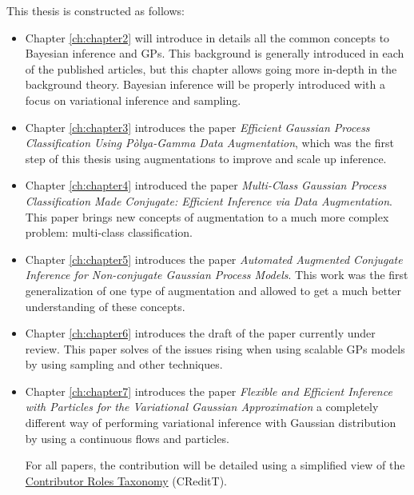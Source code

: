 This thesis is constructed as follows:
\begin{itemize}
    \item Chapter \ref{ch:chapter2} will introduce in details all the common concepts to Bayesian inference and \ac{GPs}.
          This background is generally introduced in each of the published articles, but this chapter allows going more in-depth in the background theory.
          Bayesian inference will be properly introduced with a focus on variational inference and sampling.
    \item Chapter \ref{ch:chapter3} introduces the paper \textit{Efficient Gaussian Process Classification Using P\`olya-Gamma Data Augmentation}, which was the first step of this thesis using augmentations to improve and scale up inference.
    \item Chapter \ref{ch:chapter4} introduced the paper \textit{Multi-Class Gaussian Process Classification Made Conjugate: Efficient Inference via Data Augmentation}.
          This paper brings new concepts of augmentation to a much more complex problem: multi-class classification.
    \item Chapter \ref{ch:chapter5} introduces the paper \textit{Automated Augmented Conjugate Inference for Non-conjugate Gaussian Process Models}.
          This work was the first generalization of one type of augmentation and allowed to get a much better understanding of these concepts.
    \item Chapter \ref{ch:chapter6} introduces the draft of the paper \textit{}
    currently under review.
    This paper solves of the issues rising when using scalable \ac{GPs} models by using sampling and other techniques.
    \item Chapter \ref{ch:chapter7} introduces the paper \textit{Flexible and Efficient Inference with Particles for the Variational Gaussian Approximation } a completely different way of performing variational inference with Gaussian distribution by using a continuous flows and particles.
    
    For all papers, the contribution will be detailed using a simplified view of the \href{https://mdpi-res.com/data/contributor-role-instruction.pdf}{Contributor Roles Taxonomy} (CReditT).

\end{itemize}

